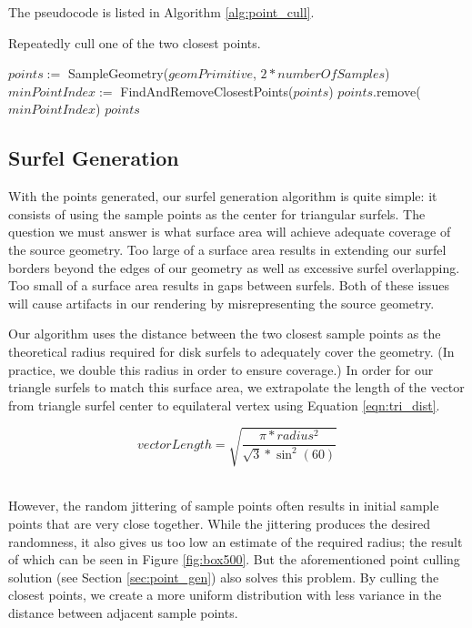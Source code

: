 The pseudocode is listed in Algorithm \ref{alg:point_cull}.

\begin{algorithm}
\captionfont
\caption[Closest point culling]{Repeatedly cull one of the two closest points.}
\label{alg:point_cull}
{\fontsize{10}{9}\selectfont
\begin{algorithmic}
      \State $points :=$ SampleGeometry($geomPrimitive$, $2*numberOfSamples$)
         \State $minPointIndex :=$ FindAndRemoveClosestPoints($points$)
         \State $points$.remove($minPointIndex$)
      \EndWhile
      \State \Return $points$
   \EndFunction
\end{algorithmic}
}
\end{algorithm}

\subsection{Surfel Generation}
\label{sec:surfel_gen}

With the points generated, our surfel generation algorithm is quite simple: it consists of using the sample points as the center for triangular surfels. The question we must answer is what surface area will achieve adequate coverage of the source geometry. Too large of a surface area results in extending our surfel borders beyond the edges of our geometry as well as excessive surfel overlapping. Too small of a surface area results in gaps between surfels. Both of these issues will cause artifacts in our rendering by misrepresenting the source geometry.

Our algorithm uses the distance between the two closest sample points as the theoretical radius required for disk surfels to adequately cover the geometry. (In practice, we double this radius in order to ensure coverage.) In order for our triangle surfels to match this surface area, we extrapolate the length of the vector from triangle surfel center to equilateral vertex using Equation \ref{eqn:tri_dist}.

\begin{equation}
vectorLength = \sqrt{ \frac{ \pi * radius^2 }{ \sqrt{3} * \sin^2(60) } }
\label{eqn:tri_dist}
\end{equation}
~

However, the random jittering of sample points often results in initial sample points that are very close together. While the jittering produces the desired randomness, it also gives us too low an estimate of the required radius; the result of which can be seen in Figure \ref{fig:box500}. But the aforementioned point culling solution (see Section \ref{sec:point_gen}) also solves this problem. By culling the closest points, we create a more uniform distribution with less variance in the distance between adjacent sample points.

